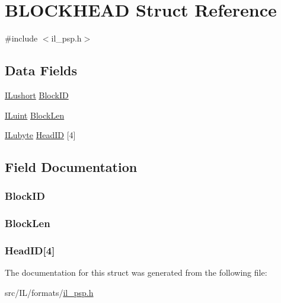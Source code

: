 \hypertarget{struct_b_l_o_c_k_h_e_a_d}{\section{B\-L\-O\-C\-K\-H\-E\-A\-D Struct Reference}
\label{struct_b_l_o_c_k_h_e_a_d}
}


{\ttfamily \#include $<$il\-\_\-psp.\-h$>$}

\subsection*{Data Fields}
\begin{DoxyCompactItemize}
\item 
\hyperlink{il_8h_af6287b43748354a7c4864da43ae56962}{I\-Lushort} \hyperlink{struct_b_l_o_c_k_h_e_a_d_ae805d0a15a6b7bc847e477855966d500}{Block\-I\-D}
\item 
\hyperlink{il_8h_ac6508d0e9c19e32f32e00d54b5b8cf30}{I\-Luint} \hyperlink{struct_b_l_o_c_k_h_e_a_d_a9d8619ab8ec5e5c2fcb1aa141fd0a942}{Block\-Len}
\item 
\hyperlink{il_8h_a8d2f04500100a86d1b00e98ab1b15a33}{I\-Lubyte} \hyperlink{struct_b_l_o_c_k_h_e_a_d_a14f5bb6cf8e2a55fa0ee3df0fdd1f0a3}{Head\-I\-D} \mbox{[}4\mbox{]}
\end{DoxyCompactItemize}


\subsection{Field Documentation}
\hypertarget{struct_b_l_o_c_k_h_e_a_d_ae805d0a15a6b7bc847e477855966d500}{
\subsubsection[{Block\-I\-D}]{ Block\-I\-D}}\label{struct_b_l_o_c_k_h_e_a_d_ae805d0a15a6b7bc847e477855966d500}
\hypertarget{struct_b_l_o_c_k_h_e_a_d_a9d8619ab8ec5e5c2fcb1aa141fd0a942}{
\subsubsection[{Block\-Len}]{ Block\-Len}}\label{struct_b_l_o_c_k_h_e_a_d_a9d8619ab8ec5e5c2fcb1aa141fd0a942}
\hypertarget{struct_b_l_o_c_k_h_e_a_d_a14f5bb6cf8e2a55fa0ee3df0fdd1f0a3}{
\subsubsection[{Head\-I\-D}]{ Head\-I\-D\mbox{[}4\mbox{]}}}\label{struct_b_l_o_c_k_h_e_a_d_a14f5bb6cf8e2a55fa0ee3df0fdd1f0a3}


The documentation for this struct was generated from the following file\-:\begin{DoxyCompactItemize}
\item 
src/\-I\-L/formats/\hyperlink{il__psp_8h}{il\-\_\-psp.\-h}\end{DoxyCompactItemize}
